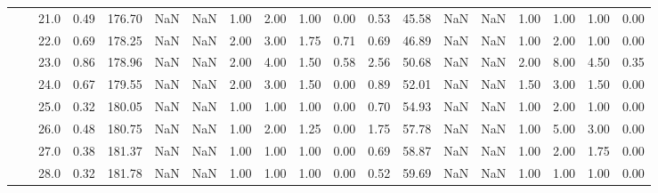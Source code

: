 \begin{tabular}{lllrrrrrrrrrrrrrrrr}
       &     & 21.0 &      0.49 &     176.70 &               NaN &                NaN &  1.00 &   2.00 &             1.00 &                         0.00 &      0.53 &      45.58 &               NaN &                NaN &  1.00 &   1.00 &             1.00 &                         0.00 \\
       &     & 22.0 &      0.69 &     178.25 &               NaN &                NaN &  2.00 &   3.00 &             1.75 &                         0.71 &      0.69 &      46.89 &               NaN &                NaN &  1.00 &   2.00 &             1.00 &                         0.00 \\
       &     & 23.0 &      0.86 &     178.96 &               NaN &                NaN &  2.00 &   4.00 &             1.50 &                         0.58 &      2.56 &      50.68 &               NaN &                NaN &  2.00 &   8.00 &             4.50 &                         0.35 \\
       &     & 24.0 &      0.67 &     179.55 &               NaN &                NaN &  2.00 &   3.00 &             1.50 &                         0.00 &      0.89 &      52.01 &               NaN &                NaN &  1.50 &   3.00 &             1.50 &                         0.00 \\
       &     & 25.0 &      0.32 &     180.05 &               NaN &                NaN &  1.00 &   1.00 &             1.00 &                         0.00 &      0.70 &      54.93 &               NaN &                NaN &  1.00 &   2.00 &             1.00 &                         0.00 \\
       &     & 26.0 &      0.48 &     180.75 &               NaN &                NaN &  1.00 &   2.00 &             1.25 &                         0.00 &      1.75 &      57.78 &               NaN &                NaN &  1.00 &   5.00 &             3.00 &                         0.00 \\
       &     & 27.0 &      0.38 &     181.37 &               NaN &                NaN &  1.00 &   1.00 &             1.00 &                         0.00 &      0.69 &      58.87 &               NaN &                NaN &  1.00 &   2.00 &             1.75 &                         0.00 \\
       &     & 28.0 &      0.32 &     181.78 &               NaN &                NaN &  1.00 &   1.00 &             1.00 &                         0.00 &      0.52 &      59.69 &               NaN &                NaN &  1.00 &   1.00 &             1.00 &                         0.00 \\

\end{tabular}
